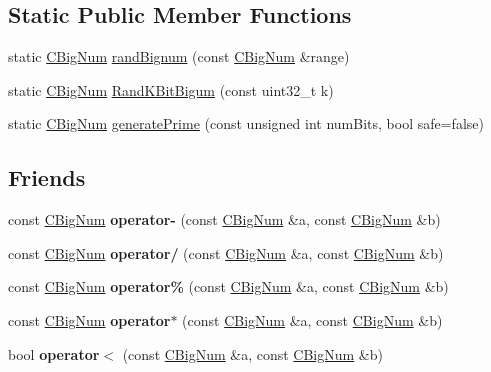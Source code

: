 \subsection*{Static Public Member Functions}
\begin{DoxyCompactItemize}
\item 
static \mbox{\hyperlink{class_c_big_num}{C\+Big\+Num}} \mbox{\hyperlink{class_c_big_num_a83e20522f042dd2b738bd26e21605e3b}{rand\+Bignum}} (const \mbox{\hyperlink{class_c_big_num}{C\+Big\+Num}} \&range)
\item 
static \mbox{\hyperlink{class_c_big_num}{C\+Big\+Num}} \mbox{\hyperlink{class_c_big_num_a200174f8261baebceb64b24a2d91f33f}{Rand\+K\+Bit\+Bigum}} (const uint32\+\_\+t k)
\item 
static \mbox{\hyperlink{class_c_big_num}{C\+Big\+Num}} \mbox{\hyperlink{class_c_big_num_a4579e2136563a20844d60d9fe513e1fe}{generate\+Prime}} (const unsigned int num\+Bits, bool safe=false)
\end{DoxyCompactItemize}
\subsection*{Friends}
\begin{DoxyCompactItemize}
\item 
\mbox{\label{class_c_big_num_aeb0210adda76affb66975146b1168f71}} 
const \mbox{\hyperlink{class_c_big_num}{C\+Big\+Num}} {\bfseries operator-\/} (const \mbox{\hyperlink{class_c_big_num}{C\+Big\+Num}} \&a, const \mbox{\hyperlink{class_c_big_num}{C\+Big\+Num}} \&b)
\item 
\mbox{\label{class_c_big_num_ac5a9fb08b1522f0cbcc30f87bac72f4b}} 
const \mbox{\hyperlink{class_c_big_num}{C\+Big\+Num}} {\bfseries operator/} (const \mbox{\hyperlink{class_c_big_num}{C\+Big\+Num}} \&a, const \mbox{\hyperlink{class_c_big_num}{C\+Big\+Num}} \&b)
\item 
\mbox{\label{class_c_big_num_a8abffdb8b9ce531fef9fc3067d7329ef}} 
const \mbox{\hyperlink{class_c_big_num}{C\+Big\+Num}} {\bfseries operator\%} (const \mbox{\hyperlink{class_c_big_num}{C\+Big\+Num}} \&a, const \mbox{\hyperlink{class_c_big_num}{C\+Big\+Num}} \&b)
\item 
\mbox{\label{class_c_big_num_a62e78c276de3957d599fd4974713fed2}} 
const \mbox{\hyperlink{class_c_big_num}{C\+Big\+Num}} {\bfseries operator$\ast$} (const \mbox{\hyperlink{class_c_big_num}{C\+Big\+Num}} \&a, const \mbox{\hyperlink{class_c_big_num}{C\+Big\+Num}} \&b)
\item 
\mbox{\label{class_c_big_num_a6db3085f36d565f1dd8589c8386d3a2f}} 
bool {\bfseries operator$<$} (const \mbox{\hyperlink{class_c_big_num}{C\+Big\+Num}} \&a, const \mbox{\hyperlink{class_c_big_num}{C\+Big\+Num}} \&b)
\end{DoxyCompactItemize}


